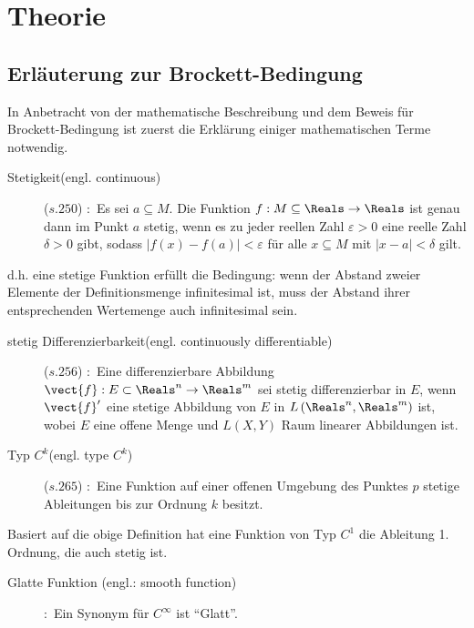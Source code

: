 \chapter{Theorie}
\label{Theorie}
\section{Erläuterung zur Brockett-Bedingung}
\label{Erläuterung zur Brockett-Bedingung}
In Anbetracht von der mathematische Beschreibung und dem Beweis für Brockett-Bedingung ist zuerst die Erklärung einiger mathematischen Terme notwendig.    
\begin{description} 
\item[Stetigkeit(engl. continuous)]\cite{grosche2003teubner}($s.250$)
:~Es sei $a\subseteq M$. Die Funktion $f:M\subseteq\Reals\to\Reals$ ist genau dann im Punkt $a$ stetig, wenn es zu jeder reellen Zahl $\varepsilon>0$ eine reelle Zahl $\delta>0$ gibt, sodass
$\left | f\left ( x \right )-f\left ( a \right ) \right |< \varepsilon$ für alle $x\subseteq M$ mit $\left | x-a \right |< \delta $ gilt.  
\end{description}
\vspace{-0.8em}
d.h. eine stetige Funktion erfüllt die Bedingung: wenn der Abstand zweier Elemente der Definitionsmenge infinitesimal ist, muss der Abstand ihrer entsprechenden Wertemenge auch infinitesimal sein.
\begin{description}
\item[stetig Differenzierbarkeit(engl. continuously differentiable)]\cite{rudin2009analysis}($s.256$)
:~Eine differenzierbare Abbildung $\vect{f}:E\subset\Reals^{n}\to \Reals^{m}$ sei stetig differenzierbar in $E$, wenn ${\vect{f}}'$ eine stetige Abbildung von $E$ in $L\left ( \Reals^{n},\Reals^{m} \right )$ ist, wobei $E$ eine offene Menge und $L\left ( X,Y \right )$ Raum linearer Abbildungen ist.
\item[Typ $C^{k}$(engl. type $C^{k}$)]\cite{grosche2003teubner}($s.265$)
:~Eine Funktion auf einer offenen Umgebung des Punktes $p$ stetige Ableitungen bis zur Ordnung $k$ besitzt.
\end{description}
\vspace{-0.8em}
Basiert auf die obige Definition hat eine Funktion von Typ $C^{1}$ die Ableitung 1. Ordnung, die auch stetig ist.
\begin{description}
\item[Glatte Funktion (engl.: smooth function)]
\cite[S. 5]{tu2010introduction}:~Ein Synonym für $C^{\infty}$ ist ``Glatt''.
\end{description}
